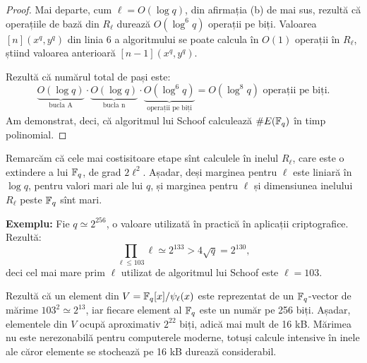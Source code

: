 \begin{proof}
    Mai departe, cum $ \ell = O(\log q) $, din afirmația (b) de mai sus,
    rezultă că operațiile de bază din $ R_\ell $ durează $ O(\log^6 q) $
    operații pe biți. Valoarea $ [n](x^q, y^q) $ din linia 6 a algoritmului
    se poate calcula în $ O(1) $ operații în $ R_\ell $, știind valoarea
    anterioară $ [n-1](x^q, y^q) $.

    Rezultă că numărul total de pași este:
    \[
        \underbrace{O(\log q)}_{\text{bucla A}} \cdot \underbrace{O(\log q)}_{\text{bucla n}} \cdot %
        \underbrace{O(\log^6 q)}_{\text{operații pe biți}} = O(\log^8 q) \text{ operații pe biți}.
    \]
    Am demonstrat, deci, că algoritmul lui Schoof calculează $ \# E(\mathbb{F}_q) $ în timp polinomial.
\end{proof}

Remarcăm că cele mai costisitoare etape sînt calculele în inelul $ R_\ell $, care este o
extindere a lui $ \mathbb{F}_q $, de grad $ 2 \ell^2 $. Așadar, deși marginea pentru $ \ell $
este liniară în $ \log q $, pentru valori mari ale lui $ q $, și marginea pentru $ \ell $
și dimensiunea inelului $ R_\ell $ peste $ \mathbb{F}_q $ sînt mari.

\textbf{Exemplu:} Fie $ q \simeq 2^{256} $, o valoare utilizată în practică în aplicații
criptografice. Rezultă:
\[
    \prod_{\ell \leq 103} \ell \simeq 2^{133} > 4 \sqrt{q} = 2^{130},
\]
deci cel mai mare prim $ \ell $ utilizat de algoritmul lui Schoof este $ \ell = 103 $.

Rezultă că un element din $ V = \mathbb{F}_q[x]/\psi_\ell(x) $ este reprezentat de un
$ \mathbb{F}_q $-vector de mărime $ 103^2 \simeq 2^{13} $, iar fiecare element al
$ \mathbb{F}_q $ este un număr pe 256 biți. Așadar, elementele din $ V $ ocupă
aproximativ $ 2^{22} $ biți, adică mai mult de 16 kB. Mărimea nu este nerezonabilă
pentru computerele moderne, totuși calcule intensive în inele ale căror elemente se
stochează pe 16 kB durează considerabil.


